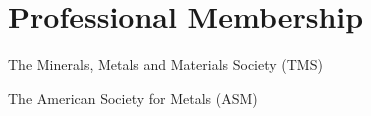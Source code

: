 \documentclass[letterpaper,11pt]{article}
\renewenvironment{itemize}{
  \begin{list}{}{
    \setlength{\leftmargin}{1.5em}
  }
}{
  \end{list}
}
\begin{document}
\section*{Professional Membership}
\begin{itemize}
    \item The Minerals, Metals and Materials Society (TMS)
    \item The American Society for Metals (ASM)
\end{itemize}


\end{document}
